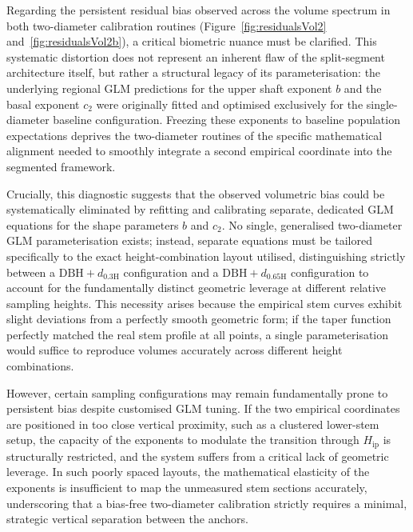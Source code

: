 \documentclass[twocolumn, bibliography=totoc]{scrartcl}
\begin{document}
Regarding the persistent residual bias observed across the volume spectrum in both two-diameter calibration routines (Figure~\ref{fig:residualsVol2} and~\ref{fig:residualsVol2b}), a critical biometric nuance must be clarified. This systematic distortion does not represent an inherent flaw of the split-segment architecture itself, but rather a structural legacy of its parameterisation: the underlying regional GLM predictions for the upper shaft exponent $b$ and the basal exponent $c_2$ were originally fitted and optimised exclusively for the single-diameter baseline configuration. Freezing these exponents to baseline population expectations deprives the two-diameter routines of the specific mathematical alignment needed to smoothly integrate a second empirical coordinate into the segmented framework. 

Crucially, this diagnostic suggests that the observed volumetric bias could be systematically eliminated by refitting and calibrating separate, dedicated GLM equations for the shape parameters $b$ and $c_2$. No single, generalised two-diameter GLM parameterisation exists; instead, separate equations must be tailored specifically to the exact height-combination layout utilised, distinguishing strictly between a $\text{DBH}+d_{0.3\text{H}}$ configuration and a $\text{DBH}+d_{0.65\text{H}}$ configuration to account for the fundamentally distinct geometric leverage at different relative sampling heights. This necessity arises because the empirical stem curves exhibit slight deviations from a perfectly smooth geometric form; if the taper function perfectly matched the real stem profile at all points, a single parameterisation would suffice to reproduce volumes accurately across different height combinations.

However, certain sampling configurations may remain fundamentally prone to persistent bias despite customised GLM tuning. If the two empirical coordinates are positioned in too close vertical proximity, such as a clustered lower-stem setup, the capacity of the exponents to modulate the transition through $H_{\text{ip}}$ is structurally restricted, and the system suffers from a critical lack of geometric leverage. In such poorly spaced layouts, the mathematical elasticity of the exponents is insufficient to map the unmeasured stem sections accurately, underscoring that a bias-free two-diameter calibration strictly requires a minimal, strategic vertical separation between the anchors.
\end{document}
